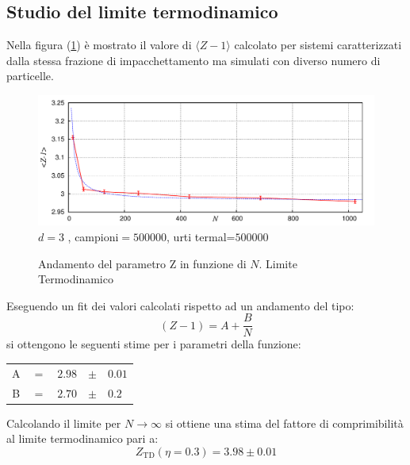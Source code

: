 \documentclass[11pt]{article}
\theoremstyle{plain}
\theoremstyle{remark}
\begin{document}
\FloatBarrier 
\subsection{Studio del limite termodinamico}
Nella figura (\ref{fig: Limite Termo}) è mostrato il valore di $\langle Z-1 \rangle$  calcolato per sistemi caratterizzati dalla stessa frazione di impacchettamento ma simulati con diverso numero di particelle.

\begin{figure}[htbp]
\centering
	\caption[Sfere Rigide$/$Problema8.cpp]{Andamento del parametro Z in funzione di $N$. Limite Termodinamico }\vspace{-10pt}
	\includegraphics[scale= 1]{Immagini/Rigide/termPvsN3D}
	\newline\footnotesize{ $d=3$ , campioni$= 500000$,  urti termal=$ 500000$}
	\label{fig: Limite Termo}
\end{figure}

Eseguendo un fit dei valori calcolati rispetto ad un andamento del tipo:
\begin{equation}\label{eq: limiteTermo}
 (Z-1) = A + \dfrac{B}{N}
\end{equation}
si ottengono le seguenti stime per i parametri della funzione:
\begin{center}
\begin{tabular}{|c c r c l |}
\hline
	A	 & $=$ & $ 2.98 $ & $\pm$ & $0.01 $	\\
	B	 & $=$ & $ 2.70$ & $\pm$ & $0.2 $	\\
\hline
\end{tabular}
\end{center}

Calcolando il limite per $N\rightarrow \infty$ si ottiene una stima del fattore di comprimibilità al limite termodinamico pari a: 
\begin{displaymath}
Z_{\textrm{TD}} (\eta = 0.3) = 3.98 \pm 0.01
\end{displaymath}


\clearpage


\FloatBarrier
\listoffigures



\end{document}
